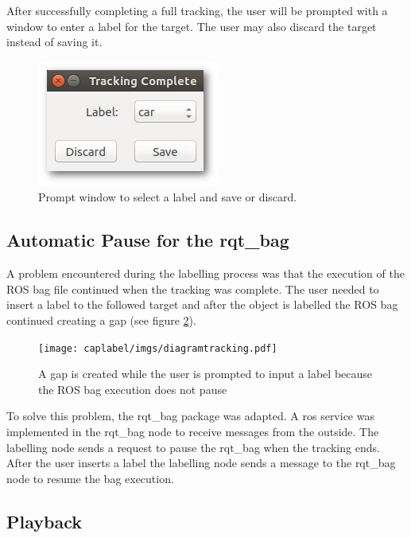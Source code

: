 After successfully completing a full tracking, the user will be prompted with a window to enter a label for the target. The user may also discard the target instead of saving it.


\begin{figure}[htp]
	\centering
	\includegraphics[width=.4\textwidth]{caplabel/imgs/labellinggui2.png}
	\caption{Prompt window to select a label and save or discard.}
	\label{fig:labellinggui2}
\end{figure}

\subsection{Automatic Pause for the rqt\_bag}

A problem encountered during the labelling process was that the execution of the ROS bag file continued when the tracking was complete. The user needed to insert a label to the followed target and after the object is labelled the ROS bag continued creating a gap (see figure \ref{fig:problem}). 

\begin{figure}[htp]
	
	\centering
	\texttt{[image: caplabel/imgs/diagramtracking.pdf]}
	
	\caption{A gap is created while the user is prompted to input a label because the ROS bag execution does not pause}
	\label{fig:problem}
	
\end{figure}

To solve this problem, the rqt\_bag package was adapted. A \gls{ros} service was implemented in the rqt\_bag node to receive messages from the outside. The labelling node sends a request to pause the rqt\_bag when the tracking ends. After the user inserts a label the labelling node sends a message to the rqt\_bag node to resume the bag execution.


\subsection{Playback}

